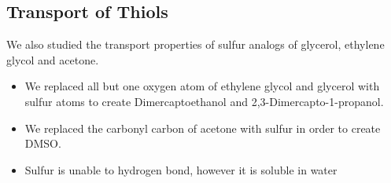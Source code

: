 \documentclass{article}
\begin{document}
  \subsection*{Transport of Thiols}
  
  We also studied the transport properties of sulfur analogs of glycerol, ethylene
  glycol and acetone.
  \begin{itemize}
    \item We replaced all but one oxygen atom of ethylene glycol and glycerol with sulfur atoms
    to create Dimercaptoethanol and 2,3-Dimercapto-1-propanol.
    \item We replaced the carbonyl carbon of acetone with sulfur in order to create DMSO. 
  	\item Sulfur is unable to hydrogen bond, however it is soluble in water  %
 \end{itemize}
  	
  
\end{document}
